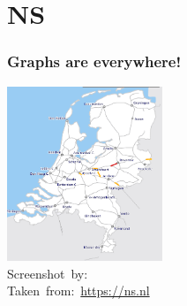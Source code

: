 \section{NS}%
\label{sec:ns}

\begin{frame}
	\frametitle{Graphs are everywhere!}
	
	\begin{center}
		\includegraphics[width=0.35\textwidth]{figures/ns.png}\\
		\hspace*{15pt}\hbox{\scriptsize Screenshot by: }\\
		\hspace*{15pt}\hbox{\scriptsize Taken from: \url{https://ns.nl}}
	\end{center}
\end{frame}


